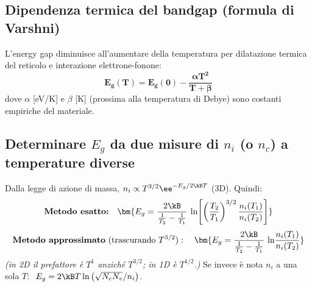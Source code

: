 
\subsection{Dipendenza termica del bandgap (formula di Varshni)}
L'energy gap diminuisce all'aumentare della temperatura per dilatazione termica del reticolo e interazione elettrone-fonone:
\[ \bm{E_g(T) = E_g(0) - \frac{\alpha T^2}{T+\beta}} \]
dove $\alpha$ [eV/K] e $\beta$ [K] (prossima alla temperatura di Debye) sono costanti empiriche del materiale.

\subsection{Determinare $E_g$ da due misure di $n_i$ (o $n_c$) a temperature diverse}
Dalla legge di azione di massa, $n_i\propto T^{3/2}\ee^{-E_g/2\kB T}$ (3D). Quindi:
\[ \textbf{Metodo esatto:}\quad \bm{E_g = \frac{2\kB}{\frac{1}{T_2}-\frac{1}{T_1}}\,\ln\!\left[\left(\frac{T_2}{T_1}\right)^{3/2}\frac{n_i(T_1)}{n_i(T_2)}\right]} \]
\[ \textbf{Metodo approssimato}\ (\text{trascurando } T^{3/2}):\quad
   \bm{E_g = \frac{2\kB}{\frac{1}{T_2}-\frac{1}{T_1}}\,\ln\!\frac{n_i(T_1)}{n_i(T_2)}} \]
\textit{(in 2D il prefattore è $T^1$ anziché $T^{3/2}$; in 1D è $T^{1/2}$.)}
Se invece è nota $n_i$ a una sola $T$: $\ E_g = 2\kB T\ln\left(\sqrt{N_cN_v}/n_i\right)$.

\newpage
